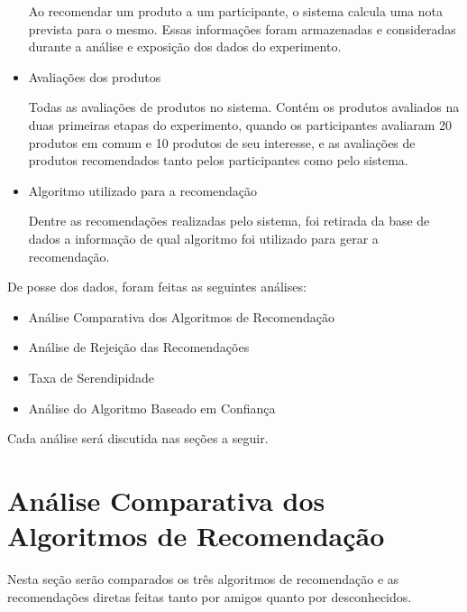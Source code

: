 \begin{itemize}
	\subitem Ao recomendar um produto a um participante, o sistema calcula uma nota prevista para o mesmo. Essas informações foram armazenadas e consideradas durante a análise e exposição dos dados do experimento.
	
	\item Avaliações dos produtos
	
	\subitem Todas as avaliações de produtos no sistema. Contém os produtos avaliados na duas primeiras etapas do experimento, quando os participantes avaliaram 20 produtos em comum e 10 produtos de seu interesse, e as avaliações de produtos recomendados tanto pelos participantes como pelo sistema.
	
	\item Algoritmo utilizado para a recomendação
	
	\subitem Dentre as recomendações realizadas pelo sistema, foi retirada da base de dados a informação de qual algoritmo foi utilizado para gerar a recomendação.
	
\end{itemize}

 De posse dos dados, foram feitas as seguintes análises:
 
\begin{itemize}
	\item Análise Comparativa dos Algoritmos de Recomendação
	\item Análise de Rejeição das Recomendações
	\item Taxa de Serendipidade
	\item Análise do Algoritmo Baseado em Confiança
\end{itemize}

 Cada análise será discutida nas seções a seguir.
 
\section{Análise Comparativa dos Algoritmos de Recomendação}
\label{sec:analise_comparativa_dos_algoritmos_de_recomendacao}

Nesta seção serão comparados os três algoritmos de recomendação e as recomendações diretas feitas tanto por amigos quanto por desconhecidos.

